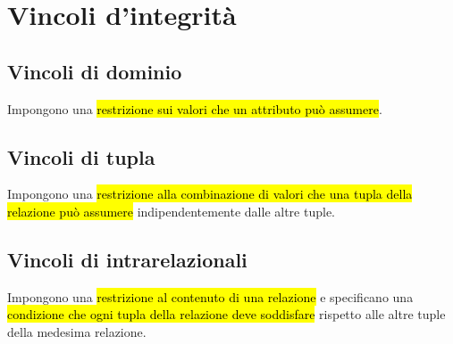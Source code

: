 \documentclass[12pt, a4paper, oneside]{book}
\begin{document}
    \section{Vincoli d'integrità}

    \subsection{Vincoli di dominio}
    Impongono una \hl{restrizione sui valori che un attributo può assumere}.


    \subsection{Vincoli di tupla}
    Impongono una \hl{restrizione alla combinazione di valori che una tupla della relazione può assumere} indipendentemente dalle altre tuple.


    \subsection{Vincoli di intrarelazionali}
    Impongono una \hl{restrizione al contenuto di una relazione} e specificano una \hl{condizione che ogni tupla della relazione deve soddisfare} rispetto alle altre tuple della medesima relazione.
\end{document}
